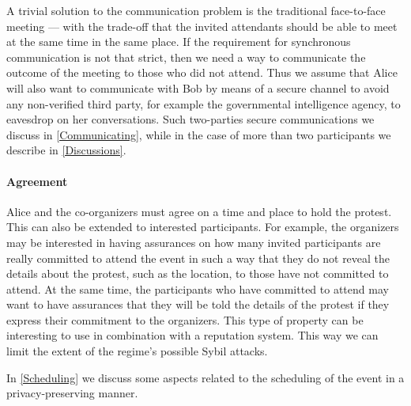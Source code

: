 A trivial solution to the communication problem is the traditional face-to-face 
meeting --- with the trade-off that the invited attendants should be able to 
meet at the same time in the same place.
If the requirement for synchronous communication is not that strict, then we 
need a way to communicate the outcome of the meeting to those who did not 
attend.
%
%
Thus we assume that Alice will also want to communicate with Bob by means of 
a secure channel to avoid any non-verified third party, for example the 
governmental intelligence agency, to eavesdrop on her conversations.
Such two-parties secure communications we discuss in \cref{Communicating}, 
while in the case of more than two participants we describe in 
\cref{Discussions}.

\paragraph{Agreement}

Alice and the co-organizers must agree on a time and place to hold the 
protest.
This can also be extended to interested participants.
For example, the organizers may be interested in having assurances on how many 
invited participants are really committed to attend the event in such a way 
that they do not reveal the details about the protest, such as the location, to 
those have not committed to attend.
At the same time, the participants who have committed to attend may want to 
have assurances that they will be told the details of the protest if they 
express their commitment to the organizers.
This type of property can be interesting to use in combination with 
a reputation system.
This way we can limit the extent of the regime's possible Sybil attacks.

In \cref{Scheduling} we discuss some aspects related to the scheduling of the 
event in a privacy-preserving manner.

%
%

